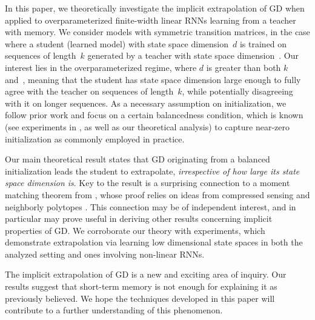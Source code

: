 In this paper, we theoretically investigate the implicit extrapolation of GD when applied to overparameterized finite-width linear RNNs learning from a teacher with memory. 
We consider models with symmetric transition matrices, in the case where a student (learned model) with state space dimension~$d$ is trained on sequences of length~$k$ generated by a teacher with state space dimension~.
Our interest lies in the overparameterized regime, where $d$ is greater than both $k$ and~, meaning that the student has state space dimension large enough to fully agree with the teacher on sequences of length~$k$, while potentially disagreeing with it on longer sequences. As a necessary assumption on initialization, we follow prior work and focus on a certain balancedness condition, which is known (see experiments in \cite{cohen2022extrapolation}, as well as our theoretical analysis) to capture near-zero initialization as commonly employed in practice.

Our main theoretical result states that GD originating from a balanced initialization leads the student to extrapolate, \emph{irrespective of how large its state space dimension is}. 
Key to the result is a surprising connection to a moment matching theorem from \cite{cohen2011use}, whose proof relies on ideas from compressed sensing \citep{Elad2010Sparse,Eldar2021CompressedSensing} and neighborly polytopes \citep{gale1963neighborly}. 
This connection may be of independent interest, and in particular may prove useful in deriving other results concerning implicit properties of GD.
We corroborate our theory with experiments, which demonstrate extrapolation via learning low dimensional state spaces in both the analyzed setting and ones involving non-linear RNNs.

The implicit extrapolation of GD is a new and exciting area of inquiry.
Our results suggest that short-term memory is not enough for explaining it as previously believed.
We hope the techniques developed in this paper will contribute to a further understanding of this phenomenon.